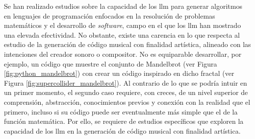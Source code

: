 Se han realizado estudios sobre la capacidad de los \gls{llm} para generar algoritmos en lenguajes de programación enfocados en la resolución de problemas matemáticos y el desarrollo de \emph{software}, campo en el que los \gls{llm} han mostrado una elevada efectividad. No obstante, existe una carencia en lo que respecta al estudio de la generación de código musical con finalidad artística, alineado con las intenciones del creador sonoro o compositor. No es equiparable desarrollar, por ejemplo, un código que muestre el conjunto de Mandelbrot (ver Figura \ref{fig:python_mandelbrot}) con crear un código inspirado en dicho fractal (ver Figura \ref{fig:supercollider_mandelbrot}). Al contrario de lo que se podría intuir en un primer momento, el segundo caso requiere, con creces, de un nivel superior de comprensión, abstracción, conocimientos previos y conexión con la realidad que el primero, incluso si su código puede ser eventualmente más simple que el de la función matemática. Por ello, se requiere de estudios específicos que exploren la capacidad de los \gls{llm} en la generación de código musical con finalidad artística.

